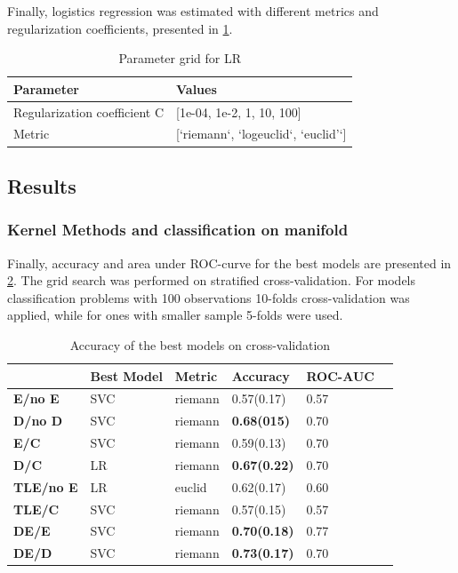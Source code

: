 \documentclass[12pt]{extarticle}
\theoremstyle{definition}
\theoremstyle{remark}
\begin{document}
	Finally, logistics regression was estimated with different metrics and regularization coefficients, presented in \cref{T:LR_par}.
	\begin{table}[H]
		\begin{center}
			\begin{tabular}{ l | l }
				Parameter &  Values\\ \hline
				Regularization coefficient C &  [1e-04, 1e-2, 1, 10, 100]\\ 
				Metric &   [`riemann`, `logeuclid`, `euclid'`]\\ 
			\end{tabular}
			\caption{Parameter grid for LR}
			\label{T:LR_par}
		\end{center}
	\end{table}
	
	\subsection{Results}
	
	\subsubsection*{Kernel Methods and classification on manifold}
	Finally, accuracy and area under ROC-curve for the best models are presented in \cref{T:res}. The grid search was performed on stratified cross-validation. For models classification problems with 100 observations 10-folds cross-validation was applied, while for ones with smaller sample 5-folds were used. 
	
	
	\begin{table}[H]
		\centering
		\begin{tabular}{l|lllll}
			& Best Model &  Metric & Accuracy& ROC-AUC   \\ \hline
			\textbf{E/no E} &  SVC &riemann &  0.57(0.17)   &   0.57  \\
			\textbf{D/no D} &   SVC& riemann   & \textbf{0.68(015)}  & 0.70    \\  
			\textbf{E/C} &    SVC &riemann  & 0.59(0.13)  & 0.70    \\ 
			\textbf{D/C} &    LR & riemann & \textbf{0.67(0.22) } & 0.70    \\ 
			\textbf{TLE/no E} &    LR &euclid & 0.62(0.17)  & 0.60    \\ 
			\textbf{TLE/C} &    SVC& riemann  & 0.57(0.15) & 0.57     \\ 
			\textbf{DE/E} &    SVC  &riemann &\textbf{0.70(0.18) }& 0.77   \\ 
			\textbf{DE/D} &    SVC & riemann & \textbf{0.73(0.17) } & 0.70    \\ 
		\end{tabular}
		\caption{Accuracy of the best models on cross-validation}
		\label{T:res}
	\end{table}
	
\end{document}
